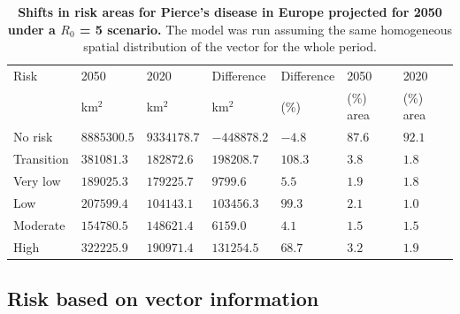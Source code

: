     \begin{table}[H]
        \centering
        \caption[Extrapolated shifts in risk areas for Pierce's disease in
            Europe in 2050]{\textbf{Shifts in risk areas for Pierce's disease
                in Europe projected for 2050 under a $R_0$ = 5 scenario.} The
            model was run
            assuming the same
            homogeneous spatial distribution of the vector for the whole
            period.}
        \begin{tabular*}{\hsize}{@{\extracolsep{\fill}}lllllll}
            \hline
            Risk & 2050 & 2020 & Difference & Difference & 2050 & 2020 \\
            & km$^2$ & km$^2$ & km$^2$ & (\%) & (\%) area & (\%) area \\
            \hline
            No risk & $8885300.5$ & $9334178.7
            $ & $-448878.2
            $ & $-4.8
            $ & $87.6
            $ & $92.1
            $ \\
            Transition & $381081.3$
            & $182872.6$ & $198208.7$ & $108.3$ & $3.8$ & $1.8$ \\
            Very low & $189025.3$ & $179225.7
            $ & $9799.6$ & $5.5$ & $1.9$ & $1.8$ \\
            Low & $207599.4$ & $104143.1$ & $103456.3$ & $99.3$ & $2.1$ & $1.0$
            \\
            Moderate & $154780.5$ & $148621.4$ & $6159.0$ & $4.1$ & $1.5$ &
            $1.5$ \\
            High & $322225.9$ & $190971.4$ & $131254.5$ & $68.7$ & $3.2$ & $1.9
            $ \\
            \hline
        \end{tabular*}
        \label{table2}
    \end{table}

    \subsection{Risk based on vector information}

